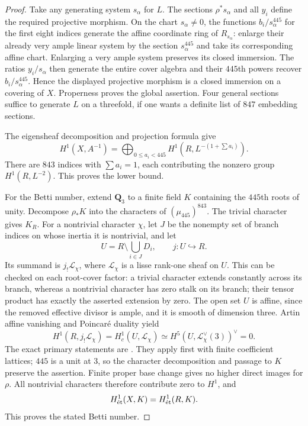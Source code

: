 \begin{proof}
Take any generating system $s_\alpha$ for $L$.  The sections $\rho^*s_\alpha$ and all $y_i$ define the required projective morphism.  On the chart $s_\alpha\ne0$, the functions $b_i/s_\alpha^{445}$ for the first eight indices generate the affine coordinate ring of $R_{s_\alpha}$: enlarge their already very ample linear system by the section $s_\alpha^{445}$ and take its corresponding affine chart.  Enlarging a very ample system preserves its closed immersion.  The ratios $y_i/s_\alpha$ then generate the entire cover algebra and their $445$th powers recover $b_i/s_\alpha^{445}$.  Hence the displayed projective morphism is a closed immersion on a covering of $X$.  Properness proves the global assertion.  Four general sections suffice to generate $L$ on a threefold, if one wants a definite list of $847$ embedding sections.

The eigensheaf decomposition and projection formula give
\[
 H^1(X,A^{-1})=
 \bigoplus_{0\leq a_i<445}
 H^1\!\left(R,L^{-(1+\sum a_i)}\right).
\]
There are $843$ indices with $\sum a_i=1$, each contributing the nonzero group $H^1(R,L^{-2})$.  This proves the lower bound.

For the Betti number, extend $\mathbf Q_3$ to a finite field $K$ containing the $445$th roots of unity.  Decompose $\rho_*K$ into the characters of $(\mu_{445})^{843}$.  The trivial character gives $K_R$.  For a nontrivial character $\chi$, let $J$ be the nonempty set of branch indices on whose inertia it is nontrivial, and let
\[
 U=R\setminus\bigcup_{i\in J}D_i,
 \qquad j:U\hookrightarrow R.
\]
Its summand is $j_!\mathcal L_\chi$, where $\mathcal L_\chi$ is a lisse rank-one sheaf on $U$.  This can be checked on each root-cover factor: a trivial character extends constantly across its branch, whereas a nontrivial character has zero stalk on its branch; their tensor product has exactly the asserted extension by zero.
The open set $U$ is affine, since the removed effective divisor is ample, and it is smooth of dimension three.  Artin affine vanishing and Poincar\'e duality yield
\[
 H^1(R,j_!\mathcal L_\chi)=H_c^1(U,\mathcal L_\chi)
   \simeq H^5(U,\mathcal L_\chi^\vee(3))^\vee=0.
\]
The exact primary statements are \cite[Expos\'e~XIV, Theorem~3.1 and Corollary~3.2, original p.~160; Expos\'e~XVIII, Theorem~3.2.5 and formula~(3.2.6.2), original pp.~585--587]{SGA4III1973}.  They apply first with finite coefficient lattices; $445$ is a unit at $3$, so the character decomposition and passage to $K$ preserve the assertion.  Finite proper base change gives no higher direct images for $\rho$.  All nontrivial characters therefore contribute zero to $H^1$, and
\[
                      H^1_{\et}(X,K)=H^1_{\et}(R,K).
\]
This proves the stated Betti number.
\end{proof}

